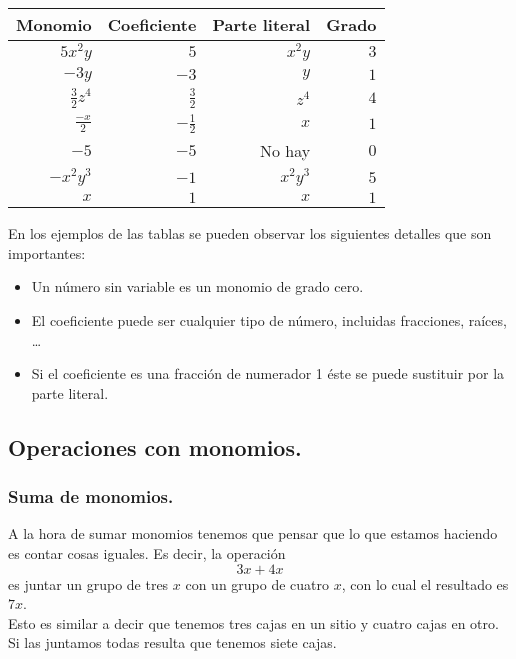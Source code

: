 \documentclass[a4paper,11pt,answers]{exam}
\begin{document}
  \begin{solution}
    \begin{center}
      \renewcommand{\arraystretch}{1.5}
      \begin{tabular}{|r|r|r|r|}
        \hline
        \multicolumn{1}{|c|}{\textbf{Monomio}} & \multicolumn{1}{c|}{\textbf{Coeficiente}} & \multicolumn{1}{c|}{\textbf{Parte literal}} & \multicolumn{1}{c|}{\textbf{Grado}} \\ \hline
        $5x^2y$&$5$&$x^2y$&$3$\\ \hline
        $-3y$&$-3$&$y$&$1$\\ \hline
        $\frac{3}{2}z^4$&$\frac{3}{2}$&$z^4$&$4$\\\hline
        $\frac{-x}{2}$&$-\frac{1}{2}$&$x$&$1$\\\hline
        $-5$&$-5$&No hay&$0$\\\hline
        $-x^2 y^3$&$-1$&$x^2 y^3$&$5$\\\hline
        $x$&$1$&$x$&$1$\\\hline
      \end{tabular}
    \end{center}
    En los ejemplos de las tablas se pueden observar los siguientes detalles que son importantes:
    \begin{itemize}
    \item Un número sin variable es un monomio de grado cero.
    \item El coeficiente puede ser cualquier tipo de número, incluidas fracciones, raíces, \dots
    \item Si el coeficiente es una fracción de numerador 1 éste se puede sustituir por la parte literal.
    \end{itemize}
  \end{solution}

  \subsection{Operaciones con monomios.}
  \subsubsection{Suma de monomios.}
  A la hora de sumar monomios tenemos que pensar que lo que estamos haciendo es contar cosas iguales. Es decir, la operación
  \[3x + 4x\]
  es juntar un grupo de tres $x$ con un grupo de cuatro $x$, con lo cual el resultado es $7x$.\\
  Esto es similar a decir que tenemos tres cajas en un sitio y cuatro cajas en otro. Si las juntamos todas resulta que tenemos siete cajas.
\end{document}
